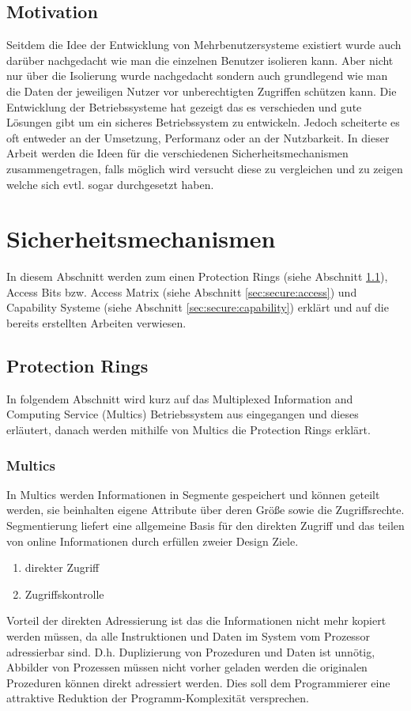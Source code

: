 \documentclass[11pt,technote]{IEEEtran}
\begin{document}
    \subsection{Motivation}
     Seitdem die Idee der Entwicklung von Mehrbenutzersysteme existiert wurde auch dar\"uber nachgedacht wie man die einzelnen Benutzer isolieren kann.
     Aber nicht nur \"uber die Isolierung wurde nachgedacht sondern auch grundlegend wie man die Daten 
     der jeweiligen Nutzer vor unberechtigten Zugriffen sch\"utzen kann.
     Die Entwicklung der Betriebssysteme hat gezeigt das es verschieden und gute L\"osungen gibt um ein sicheres Betriebssystem zu entwickeln.
     Jedoch scheiterte es oft entweder an der Umsetzung, Performanz oder an der Nutzbarkeit. 
     In dieser Arbeit werden die Ideen f\"ur die verschiedenen Sicherheitsmechanismen zusammengetragen,
     falls m\"oglich wird versucht diese zu vergleichen und zu zeigen welche sich evtl. sogar durchgesetzt haben.
     
  \section{Sicherheitsmechanismen} \label{sec:secure}
    In diesem Abschnitt werden zum einen Protection Rings (siehe Abschnitt \ref{sec:secure:protectrings}), Access Bits bzw. Access Matrix 
    (siehe Abschnitt \ref{sec:secure:access}) und Capability Systeme (siehe Abschnitt \ref{sec:secure:capability}) erkl\"art und 
    auf die bereits erstellten Arbeiten verwiesen.
    \subsection{Protection Rings} \label{sec:secure:protectrings}
      In folgendem Abschnitt wird kurz auf das Multiplexed Information and Computing Service (Multics) Betriebssystem
      aus \cite{inproc:multics} eingegangen und dieses erl\"autert, danach werden mithilfe von Multics die Protection Rings erkl\"art.
      \subsubsection{Multics}  
        In Multics werden Informationen in Segmente gespeichert und k\"onnen geteilt 
				werden, sie beinhalten eigene Attribute \"uber deren Gr\"o\ss e sowie die Zugriffsrechte.
				Segmentierung liefert eine allgemeine Basis f\"ur den direkten Zugriff und das teilen von online Informationen durch erf\"ullen zweier Design Ziele.
		    \begin{enumerate}
		      \item direkter Zugriff
		      \item Zugriffskontrolle
        \end{enumerate}
		    Vorteil der direkten Adressierung ist das die Informationen nicht mehr kopiert werden m\"ussen, da alle Instruktionen und Daten
		    im System vom Prozessor adressierbar sind. D.h. Duplizierung von Prozeduren und Daten ist unn\"otig, Abbilder von Prozessen m\"ussen
		    nicht vorher geladen werden die originalen Prozeduren k\"onnen direkt adressiert werden.
		    Dies soll dem Programmierer eine attraktive Reduktion der Programm-Komplexit\"at versprechen.
		  
\end{document}
